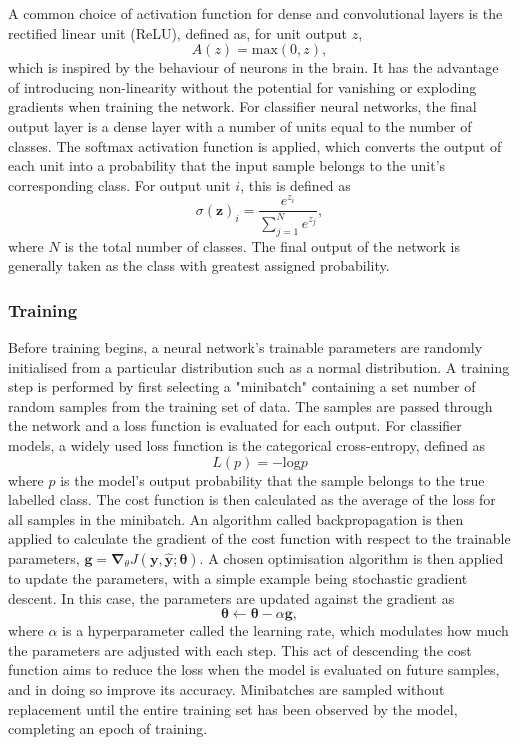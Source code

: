 \documentclass[12pt]{article}
\begin{document}
A common choice of activation function for dense and convolutional layers is the rectified linear unit (ReLU), defined as, for unit output $z$,
\begin{equation}
A(z)=\mathrm{max}(0, z), \label{relu}
\end{equation}
which is inspired by the behaviour of neurons in the brain. It has the advantage of introducing non-linearity without the potential for vanishing or exploding gradients when training the network. For classifier neural networks, the final output layer is a dense layer with a number of units equal to the number of classes. The softmax activation function is applied, which converts the output of each unit into a probability that the input sample belongs to the unit's corresponding class. For output unit $i$, this is defined as
\begin{equation}
\sigma(\bm{z})_i=\frac{e^{z_i}}{\sum_{j=1}^Ne^{z_j}}, \label{softmax}
\end{equation}
where $N$ is the total number of classes. The final output of the network is generally taken as the class with greatest assigned probability.

\subsubsection{Training}
Before training begins, a neural network's trainable parameters are randomly initialised from a particular distribution such as a normal distribution. A training step is performed by first selecting a "minibatch" containing a set number of random samples from the training set of data. The samples are passed through the network and a loss function is evaluated for each output. For classifier models, a widely used loss function is the categorical cross-entropy, defined as
\begin{equation}
L(p)=-\mathrm{log}p
\end{equation}
where $p$ is the model's output probability that the sample belongs to the true labelled class. The cost function is then calculated as the average of the loss for all samples in the minibatch. An algorithm called backpropagation is then applied to calculate the gradient of the cost function with respect to the trainable parameters, $\bm{g}=\bm{\nabla}_{\theta}J(\bm{y},\hat{\bm{y}};\bm{\theta})$. A chosen optimisation algorithm is then applied to update the parameters, with a simple example being stochastic gradient descent. In this case, the parameters are updated against the gradient as
\begin{equation}
\bm{\theta}\leftarrow\bm{\theta}-\alpha\bm{g},
\end{equation}
where $\alpha$ is a hyperparameter called the learning rate, which modulates how much the parameters are adjusted with each step. This act of descending the cost function aims to reduce the loss when the model is evaluated on future samples, and in doing so improve its accuracy. Minibatches are sampled without replacement until the entire training set has been observed by the model, completing an epoch of training.
\end{document}
